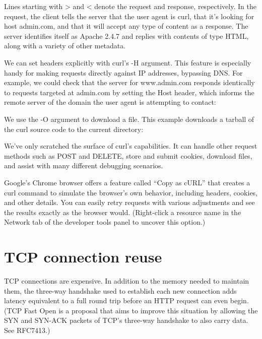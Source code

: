 
Lines starting with \textgreater{} and \textless{} denote the request
and response, respectively. In the request, the client tells the server
that the user agent is {curl}, that it's looking for host admin.com, and
that it will accept any type of content as a response. The server
identifies itself as Apache 2.4.7 and replies with contents of type
HTML, along with a variety of other metadata.

We can set headers explicitly with {curl}'s {-H} argument. This feature
is especially handy for making requests directly against IP addresses,
bypassing DNS. For example, we could check that the server for
www.admin.com responds identically to requests targeted at admin.com by
setting the Host header, which informs the remote server of the domain
the user agent is attempting to contact:


We use the {-O} argument to download a file. This example downloads a
tarball of the {curl} source code to the current directory:


We've only scratched the surface of {curl}'s capabilities. It can handle
other request methods such as POST and DELETE, store and submit cookies,
download files, and assist with many different debugging scenarios.

Google's Chrome browser offers a feature called ``Copy as cURL'' that
creates a {curl} command to simulate the browser's own behavior,
including headers, cookies, and other details. You can easily retry
requests with various adjustments and see the results exactly as the
browser would. (Right-click a resource name in the Network tab of the
developer tools panel to uncover this option.)


\section{TCP connection reuse}

\protect\hypertarget{part0027_split_005.htmlux5cux23_idIndexMarker2765}{}{}\protect\hypertarget{part0027_split_005.htmlux5cux23_idIndexMarker2766}{}{}TCP
connections are expensive. In addition to the memory needed to maintain
them, the three-way handshake used to establish each new connection adds
latency equivalent to a full round trip before an HTTP request can even
begin.
(\protect\hypertarget{part0027_split_005.htmlux5cux23_idIndexMarker2767}{}{}\protect\hypertarget{part0027_split_005.htmlux5cux23_idIndexMarker2768}{}{}TCP
Fast Open is a proposal that aims to improve this situation by allowing
the SYN and SYN-ACK packets of TCP's three-way handshake to also carry
data. See RFC7413.)


